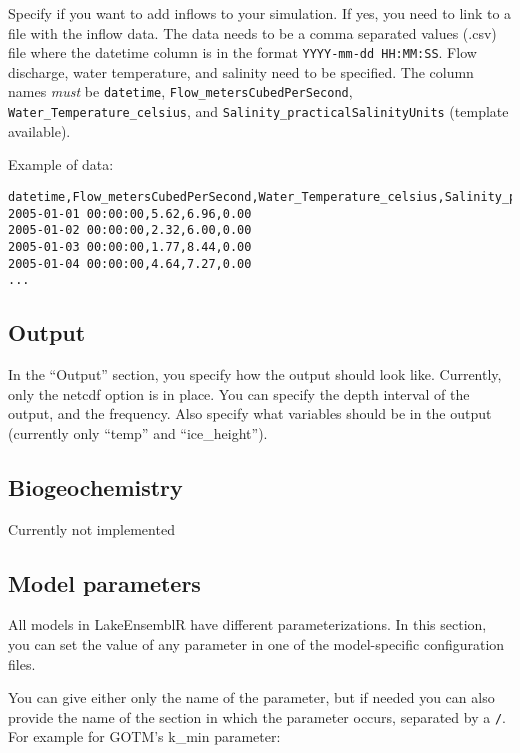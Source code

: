 \documentclass[
]{article}
\begin{document}
Specify if you want to add inflows to your simulation. If yes, you need
to link to a file with the inflow data. The data needs to be a comma
separated values (.csv) file where the datetime column is in the format
\texttt{YYYY-mm-dd\ HH:MM:SS}. Flow discharge, water temperature, and
salinity need to be specified. The column names \emph{must} be
\texttt{datetime}, \texttt{Flow\_metersCubedPerSecond},
\texttt{Water\_Temperature\_celsius}, and
\texttt{Salinity\_practicalSalinityUnits} (template available).

Example of data:

\begin{verbatim}
datetime,Flow_metersCubedPerSecond,Water_Temperature_celsius,Salinity_practicalSalinityUnits
2005-01-01 00:00:00,5.62,6.96,0.00
2005-01-02 00:00:00,2.32,6.00,0.00
2005-01-03 00:00:00,1.77,8.44,0.00
2005-01-04 00:00:00,4.64,7.27,0.00
...
\end{verbatim}

\hypertarget{output}{%
\subsection{Output}\label{output}}

In the ``Output'' section, you specify how the output should look like.
Currently, only the netcdf option is in place. You can specify the depth
interval of the output, and the frequency. Also specify what variables
should be in the output (currently only ``temp'' and ``ice\_height'').

\hypertarget{biogeochemistry}{%
\subsection{Biogeochemistry}\label{biogeochemistry}}

Currently not implemented

\hypertarget{model-parameters}{%
\subsection{Model parameters}\label{model-parameters}}

All models in LakeEnsemblR have different parameterizations. In this
section, you can set the value of any parameter in one of the
model-specific configuration files.

You can give either only the name of the parameter, but if needed you
can also provide the name of the section in which the parameter occurs,
separated by a \texttt{/}. For example for GOTM's k\_min parameter:
\end{document}
